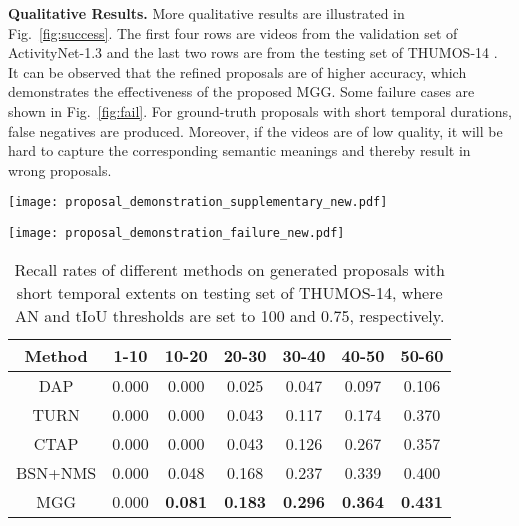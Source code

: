 \documentclass[10pt,twocolumn,letterpaper]{article}
\begin{document}
\textbf{Qualitative Results.}
More qualitative results are illustrated in Fig.~\ref{fig:success}. The first four rows are videos from the validation set of ActivityNet-1.3 \cite{activitynet} and the last two rows are from the testing set of THUMOS-14 \cite{thumos}. It can be observed that the refined proposals are of higher accuracy, which demonstrates the effectiveness of the proposed MGG.
Some failure cases are shown in Fig.~\ref{fig:fail}. For ground-truth proposals with short temporal durations, false negatives are produced. Moreover, if the videos are of low quality, it will be hard to capture the corresponding semantic meanings and thereby result in wrong proposals. 



\begin{figure*}[t]
\centering
\texttt{[image: proposal\_demonstration\_supplementary\_new.pdf]}
\caption{Qualitative results of proposals generated by
MGG. First four rows represent temporal proposals on ActivityNet-1.3.
Last two rows represent temporal proposals on THUMOS-14.
After TBA  adopted to adjust proposal boundaries generated by segment proposal generator (SPG), the refined proposals will have high overlap with the ground-truth proposals.}
\label{fig:success}
\end{figure*}

\begin{figure*}[t]
\centering
\texttt{[image: proposal\_demonstration\_failure\_new.pdf]}
\caption{Failure cases generated by
MGG on THUMOS-14.
For ground-truths with short temporal spans (first two rows), it is challenging for MGG to locate them. While quality of video frames is poorer (the last row), the performance will be reduced further.}
\label{fig:fail}
\end{figure*}
\begin{table}[H]
\scriptsize
\caption{Recall rates of different methods on generated
proposals with short temporal extents on testing set of THUMOS-14, where AN and tIoU
thresholds are set to 100 and 0.75, respectively.}
\label{recall}
\begin{tabular}{c|cccccc}
\toprule
Method & 1-10 & 10-20 & 20-30 & 30-40 & 40-50 & 50-60 \\
\hline
DAP \cite{dap}                         & 0.000       & 0.000  & 0.025  & 0.047  & 0.097   & 0.106    \\
TURN \cite{turn_tap}                        & 0.000                      & 0.000  & 0.043  & 0.117  & 0.174   & 0.370    \\
CTAP \cite{ctap}                        & 0.000                      & 0.000  & 0.043  & 0.126  & 0.267   & 0.357    \\
BSN+NMS \cite{bsn}                        & 0.000                      & 0.048  & 0.168  & 0.237  & 0.339   & 0.400    \\
MGG                         & 0.000            & \textbf{0.081} & \textbf{0.183}& \textbf{0.296}& \textbf{0.364}&\textbf{0.431}    \\
\bottomrule
\end{tabular}
\end{table}
\end{document}
